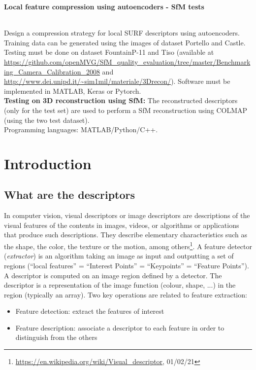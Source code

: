 
{\raggedright\large\textbf{Local feature compression using autoencoders - SfM tests}}\smallskip \\ 
Design a compression strategy for local SURF descriptors using autoencoders. Training data can be generated using the images of dataset Portello and Castle. Testing must be done on dataset FountainP-11 and Tiso (available at \url{https://github.com/openMVG/SfM_quality_evaluation/tree/master/Benchmarking_Camera_Calibration_2008} and \url{http://www.dei.unipd.it/~sim1mil/materiale/3Drecon/}). Software must be implemented in MATLAB, Keras or Pytorch. \\ \textbf{Testing on 3D reconstruction using SfM:} The reconstructed descriptors (only for the test set) are used to perform a SfM reconstruction using COLMAP (using the two test dataset). \\
Programming languages: MATLAB/Python/C++.

\section{Introduction}

\subsection{What are the descriptors}
In computer vision, visual descriptors or image descriptors are descriptions of the visual features of the contents in images, videos, or algorithms or applications that produce such descriptions. They describe elementary characteristics such as the shape, the color, the texture or the motion, among others\footnote{\url{https://en.wikipedia.org/wiki/Visual_descriptor}, 01/02/21}. A feature detector (\emph{extractor}) is an algorithm taking an image as input and outputting a set of regions (``local features'' = ``Interest Points'' = ``Keypoints'' = ``Feature Points''). A descriptor is computed on an image region defined by a detector. The descriptor is a representation of the image function (colour, shape, ...) in the region (typically an array). Two key operations are related to feature extraction:
\begin{itemize}
\item Feature detection: extract the features of interest
\item Feature description: associate a descriptor to each feature in order to distinguish from the others
\end{itemize}

